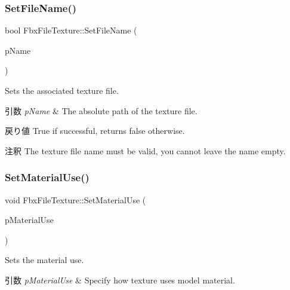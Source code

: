 \subsubsection{\texorpdfstring{Set\+File\+Name()}{SetFileName()}}
{\footnotesize\ttfamily bool Fbx\+File\+Texture\+::\+Set\+File\+Name (\begin{DoxyParamCaption}\item[{const char $\ast$}]{p\+Name }\end{DoxyParamCaption})}

Sets the associated texture file. 
\begin{DoxyParams}{引数}
{\em p\+Name} & The absolute path of the texture file. \\
\hline
\end{DoxyParams}
\begin{DoxyReturn}{戻り値}
{\ttfamily True} if successful, returns {\ttfamily false} otherwise. 
\end{DoxyReturn}
\begin{DoxyRemark}{注釈}
The texture file name must be valid, you cannot leave the name empty. 
\end{DoxyRemark}
\mbox{\label{class_fbx_file_texture_a8902fda7fce4a7329086aa0de5fdc49a}} 
\subsubsection{\texorpdfstring{Set\+Material\+Use()}{SetMaterialUse()}}
{\footnotesize\ttfamily void Fbx\+File\+Texture\+::\+Set\+Material\+Use (\begin{DoxyParamCaption}\item[{\hyperlink{class_fbx_file_texture_ae85eb429015d450d8cb8a753634c0d1e}{E\+Material\+Use}}]{p\+Material\+Use }\end{DoxyParamCaption})}

Sets the material use. 
\begin{DoxyParams}{引数}
{\em p\+Material\+Use} & Specify how texture uses model material. \\
\hline
\end{DoxyParams}
\mbox{\label{class_fbx_file_texture_a08163cb0f5af0e9dee35a1e758618cad}} 
